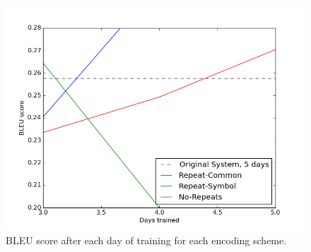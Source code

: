 \begin{figure}
  \centering
  \includegraphics[scale=0.6]{images/graph.png}
  \caption{BLEU score after each day of training for each encoding scheme.}
  \label{fig:graph}
\end{figure}